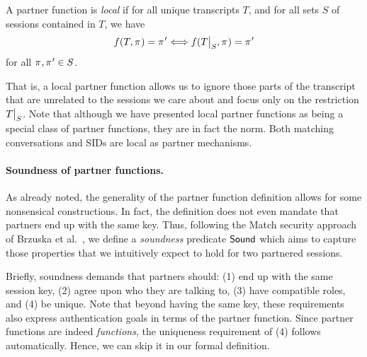 \begin{definition}\label{def:local_partnering}
A partner function is \emph{local} if for all unique transcripts $T$,
and for all sets $S$ of sessions contained in $T$,
we have 
\begin{equation}
	f(T,\oracle) = \oracle' \Longleftrightarrow f(\restrict{T}{S}, \oracle) = \oracle' 
\end{equation}
for all $\oracle, \oracle' \in S$.
\end{definition}

That is, 
a local partner function allows us to ignore those parts of the transcript that are unrelated to the sessions we care about and focus only on the restriction $\restrict{T}{S}$.
Note that although we have presented local partner functions as being a special class of partner functions,
they are in fact the norm.
Both matching conversations and SIDs are local as partner mechanisms.









\paragraph{Soundness of partner functions.}
As already noted,
the generality of the partner function definition allows for some nonsensical constructions.
In fact,
the definition does not even mandate that partners end up with the same key.
Thus,
following the \textsf{Match} security approach of Brzuska et al.~\cite{CCS:BFWW11},
we define a \emph{soundness} predicate $\mathsf{Sound}$ which aims to capture those properties that we intuitively expect to hold for two partnered sessions.


Briefly,
soundness demands that partners should:
(1) end up with the same session key,
(2) agree upon who they are talking to,
(3) have compatible roles, and
(4) be unique. 
Note that beyond having the same key,
these requirements also express authentication goals in terms of the partner function.
Since partner functions are indeed \emph{functions},
the uniqueness requirement of (4) follows automatically.
Hence,
we can skip it in our formal definition.




